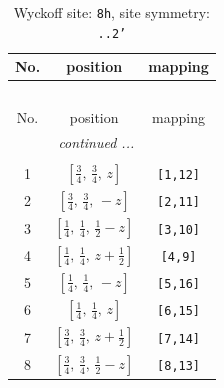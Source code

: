 \documentclass[fleqn,8pt]{jsarticle}
\begin{document}
\begin{longtable}{ccc}
\caption{Wyckoff site: {\tt 8h}, site symmetry: {\tt ..2'}}
 \\
 \hline \hline
No. & position & mapping \\ \hline \endfirsthead

\multicolumn{2}{l}{\tablename\ \thetable{}} \\
 \hline \hline
No. & position & mapping \\ \hline \endhead

 \hline \hline
\multicolumn{2}{r}{\footnotesize\it continued ...} \\ \endfoot

 \hline \hline
\multicolumn{2}{r}{} \\ \endlastfoot

1 & $\left[ \frac{3}{4},\, \frac{3}{4},\, z \right]$ & {\tt [1,12]} \\ \hline
2 & $\left[ \frac{3}{4},\, \frac{3}{4},\, - z \right]$ & {\tt [2,11]} \\ \hline
3 & $\left[ \frac{1}{4},\, \frac{1}{4},\, \frac{1}{2} - z \right]$ & {\tt [3,10]} \\ \hline
4 & $\left[ \frac{1}{4},\, \frac{1}{4},\, z + \frac{1}{2} \right]$ & {\tt [4,9]} \\ \hline
5 & $\left[ \frac{1}{4},\, \frac{1}{4},\, - z \right]$ & {\tt [5,16]} \\ \hline
6 & $\left[ \frac{1}{4},\, \frac{1}{4},\, z \right]$ & {\tt [6,15]} \\ \hline
7 & $\left[ \frac{3}{4},\, \frac{3}{4},\, z + \frac{1}{2} \right]$ & {\tt [7,14]} \\ \hline
8 & $\left[ \frac{3}{4},\, \frac{3}{4},\, \frac{1}{2} - z \right]$ & {\tt [8,13]} \\
\end{longtable}
\renewcommand{\arraystretch}{1.2}
\end{document}
